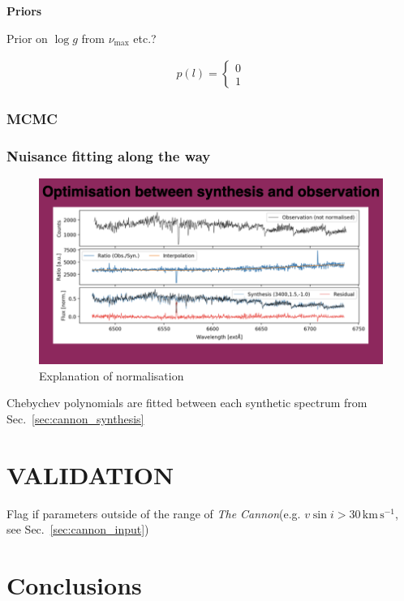 \documentclass[
  journal=pasa,
  manuscript=research-paper, %
  year=2021,
  volume=37,
]{cup-journal}
\newcommand{\logg}{$\log g$\xspace}
\newcommand{\numax}{$\nu_\mathrm{max}$\xspace}
\newcommand{\vsini}{$v \sin i$\xspace}
\newcommand{\TheCannon}{\textit{The Cannon}\xspace}
\newcommand{\kms}{\,\mathrm{km\,s^{-1}}}	%
\begin{document}
\textbf{Priors}

Prior on \logg from \numax etc.?

\begin{align}
    p (l) = \begin{cases} 0 \\ 1 \end{cases}
\end{align}

\subsubsection{MCMC}

\subsubsection{Nuisance fitting along the way}


\begin{figure}[hbt!]
 \centering
 \includegraphics[width=\columnwidth]{figures/ratio_normalisation.png}
 \caption{Explanation of normalisation}
 \label{fig:ratio_normalisation}
\end{figure}

Chebychev polynomials are fitted between each synthetic spectrum from Sec.~\ref{sec:cannon_synthesis}

\section{VALIDATION}

Flag if parameters outside of the range of \TheCannon (e.g. \vsini$ > 30 \kms$, see Sec.~\ref{sec:cannon_input})

\section{Conclusions}
\end{document}
